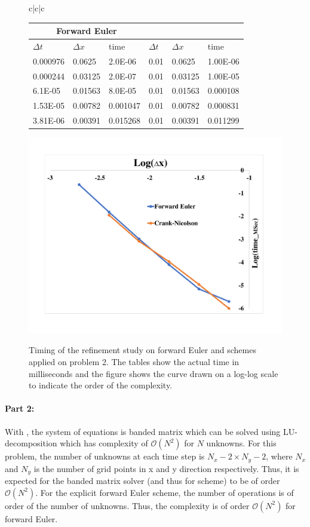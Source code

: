 \begin{figure}[tbh]
 \centering  
  \begin{tabular}{c|c|c}
\begin{tabular}{ |p{2cm}|p{2cm}|p{2cm}|p{2cm}|p{2cm}|p{2cm}}
 \hline
 \multicolumn{3}{|c|}{Forward Euler} &  \multicolumn{3}{c}{\protect{\cn}}\\
 \hline
 $\Delta t$ &  $\Delta x$  & time & $\Delta t$ &  $\Delta x$  & time\\
 \hline
 0.000976 & 0.0625  & 2.0E-06   &  0.01  & 0.0625  & 1.00E-06\\
 0.000244 & 0.03125 & 2.0E-07   &  0.01  & 0.03125 & 1.00E-05\\
 6.1E-05  &  0.01563 & 8.0E-05  &  0.01  & 0.01563 & 0.000108\\
 1.53E-05 & 0.00782 & 0.001047  &  0.01  & 0.00782 & 0.000831\\
 3.81E-06 & 0.00391 & 0.015268  &  0.01  & 0.00391 & 0.011299\\
 \hline
\end{tabular} 
   \end{tabular}   
        
   {\includegraphics[width=0.6\linewidth]{fig/timing.pdf}}
  \caption{Timing of the refinement study on forward Euler and \protect{\cn} schemes applied on problem 2. The tables show the actual time in milliseconds and the figure shows the curve drawn on a log-log scale to indicate the order of the complexity.}
   \label{fig:time}
\end{figure} 


   
\paragraph{Part 2:} With \protect{\cn}, the system of equations is banded matrix which can be solved using LU-decomposition \cite{press1987numerical} which has complexity of $\mathcal{O}(N^2)$ for $N$ unknowns. For this problem, the number of unknowns at each time step is $N_{x}-2 \times N_{y}-2$, where $N_{x}$ and $N_{y}$ is the number of grid points in x and y direction respectively. Thus, it is expected for the banded matrix solver (and thus for \protect{\cn} scheme) to be of order $\mathcal{O}(N^2)$. For the explicit forward Euler scheme, the number of operations is of order of the number of unknowns. Thus, the complexity is of order $\mathcal{O}(N^2)$ for forward Euler. 


